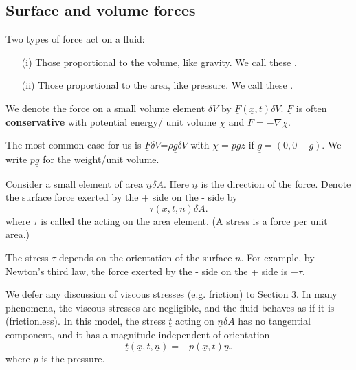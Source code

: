 \documentclass[egregdoesnotlikesansseriftitles,a4paper]{scrartcl}
\renewcommand{\vec}[1]{\underline{#1}}
\begin{document}
\subsection{Surface and volume forces}
Two types of force act on a fluid:
\begin{itemize}
    \item[(i)] Those proportional to the volume, like gravity. We call these .
    \item[(ii)] Those proportional to the area, like pressure. We call these . 
\end{itemize}
\begin{definition*}
     We denote the force on a small volume element $\delta V$ by $\vec{F} (\vec{x},t)\delta V$. $\vec{F}$ is often \textbf{conservative} with potential energy/ unit volume $\chi$ and $F=-\nabla \chi$.

     The most common case for us is $\vec{F} \delta V$=$\rho \vec{g} \delta V$ with $\chi=pgz$ if $\vec{g}=(0,0-g)$. We write $p \vec{g}$ for the weight/unit volume.
\end{definition*}
\begin{definition*}
     Consider a small element of area $\vec{n} \delta A$. Here $\vec{n}$ is the direction of the force. Denote the surface force exerted by the + side on the - side by \[
     \vec{\tau} (\vec{x},t,\vec{n})\delta A
     .\] where $\vec{\tau}$ is called the  acting on the area element. (A stress is a force per unit area.)
\end{definition*}
\begin{remark}
     The stress $\vec{\tau}$ depends on the orientation of the surface $\vec{n}$. For example, by Newton's third law, the force exerted by the - side on the + side is $-\vec{\tau}$.
\end{remark}
We defer any discussion of viscous stresses (e.g. friction) to Section 3. In many phenomena, the viscous stresses are negligible, and the fluid behaves as if it is  (frictionless). In this model, the stress $\vec{t}$ acting on $\vec{n}\delta A$ has no tangential component, and it has a magnitude independent of orientation \[
\vec{t} (\vec{x}, t , \vec{n})=- p (\vec{x},t) \vec{n}
.\] where $p$ is the pressure.
\end{document}
